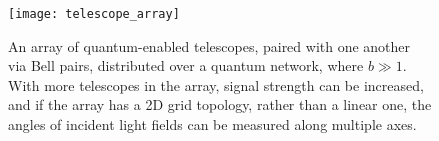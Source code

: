 \begin{figure}[!htbp]
\texttt{[image: telescope\_array]}
	\captionspacefig \caption{An array of quantum-enabled telescopes, paired with one another via Bell pairs, distributed over a quantum network, where \mbox{$b\gg 1$}. With more telescopes in the array, signal strength can be increased, and if the array has a 2D grid topology, rather than a linear one, the angles of incident light fields can be measured along multiple axes.}\label{fig:telescope_array}
\end{figure}

